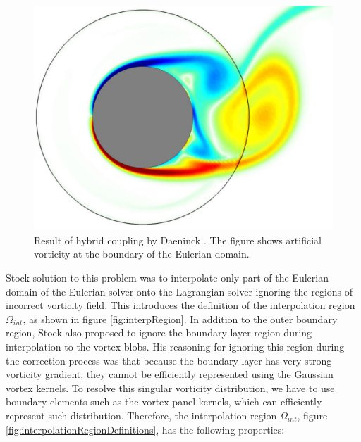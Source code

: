 	\begin{figure}[h]
	\centering
	\includegraphics[width=0.5\linewidth]{./figures/hybrid/daeninck_CylinderVorticity.png}
	\caption{Result of hybrid coupling by Daeninck \cite{Daeninck2006}. The figure shows artificial vorticity at the boundary of the Eulerian domain.}
	\label{fig:daeninck_CylinderVorticity}
	\end{figure}

Stock solution to this problem was to interpolate only part of the Eulerian domain of the Eulerian solver onto the Lagrangian solver ignoring the regions of incorrect vorticity field. This introduces the definition of the interpolation region $\Omega_{int}$, as shown in figure \ref{fig:interpRegion}. In addition to the outer boundary region, Stock also proposed to ignore the boundary layer region during interpolation to the vortex blobs. His reasoning for ignoring this region during the correction process was that because the boundary layer has very strong vorticity gradient, they cannot be efficiently represented using the Gaussian vortex kernels. To resolve this singular vorticity distribution, we have to use boundary elements such as the vortex panel kernels, which can efficiently represent such distribution. Therefore, the interpolation region $\Omega_{int}$, figure \ref{fig:interpolationRegionDefinitions}, has the following properties:

